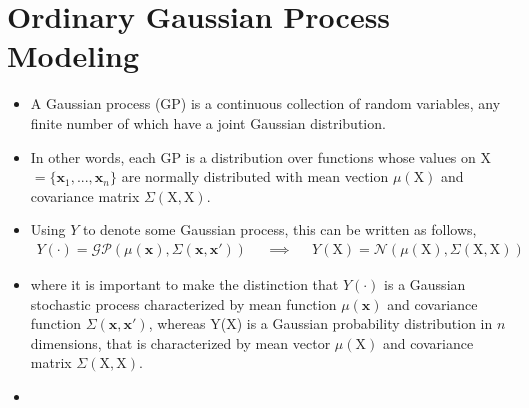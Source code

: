 \documentclass[11pt]{article}
\begin{document}
\section{Ordinary Gaussian Process Modeling}
\begin{itemize}
\item A Gaussian process (GP) is a continuous collection of random variables,
any finite number of which have a joint Gaussian distribution.
\item In other words, each GP is a distribution over functions whose
values on X$= \{\mathbf{x}_1,...,\mathbf{x}_n\}$
are normally distributed with mean vection $\mu(\mathrm{X})$ and covariance
matrix $\Sigma(\mathrm{X, X})$.
\item Using $Y$ to denote some Gaussian process, this can be written as
follows,
\begin{align*}
	Y(\cdot)
=
	\mathcal{GP}
	\left(
		\mu(\mathbf{x}),
		\Sigma(\mathbf{x}, \mathbf{x}')
	\right)
&& \implies &&
	Y(\mathrm{X})
=
	\mathcal{N}
	\left(
		\mu(\mathrm{X}),
		\Sigma(\mathrm{X, X})
	\right)
\end{align*}
\item where it is important to make the distinction that $Y(\cdot)$ is a
Gaussian stochastic process characterized by mean function $\mu(\mathbf{x})$
and covariance function $\Sigma(\mathbf{x}, \mathbf{x'})$, whereas Y(X) is a
Gaussian probability distribution in $n$ dimensions, that is characterized by
mean vector $\mu(\mathrm{X})$ and covariance matrix $\Sigma(\mathrm{X, X})$.
\item 
\end{itemize}
\end{document}
